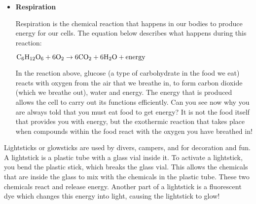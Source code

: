 \begin{enumerate}
{\begin{itemize}
\begin{center}
$\rm{Fuel + Oxygen \rightarrow Heat + Water + Carbon Dioxide}$ 

$\rm{CH_{4} + 2O_{2} \rightarrow Heat + 2H_{2}O + CO_{2}}$
\end{center}

This is why we burn fuels for energy, because the chemical changes that take place during the reaction release huge amounts of energy, which we then use for things like power and electricity. You should also note that \textit{carbon dioxide} is produced during this reaction. Later we will discuss some of the negative impacts of $CO_{2}$ on the environment. The chemical reaction that takes place when fuels burn therefore has both positive and negative consequences.\\

  \item{\textbf{Respiration}} 

Respiration is the chemical reaction that happens in our bodies to produce energy for our cells. The equation below describes what happens during this reaction:

\begin{center}
$\rm{C_{6}H_{12}O_{6} + 6O_{2} \rightarrow 6CO_{2} + 6H_{2}O + energy}$
\end{center}

In the reaction above, glucose (a type of carbohydrate in the food we eat) reacts with oxygen from the air that we breathe in, to form carbon dioxide (which we breathe out), water and energy. The energy that is produced allows the cell to carry out its functions efficiently. Can you see now why you are always told that you must eat food to get energy? It is not the food itself that provides you with energy, but the exothermic reaction that takes place when compounds within the food react with the oxygen you have breathed in! 
\end{itemize}
}
\end{enumerate}

\begin{IFact}{
Lightsticks or glowsticks are used by divers, campers, and for decoration and fun. A lightstick is a plastic tube with a glass vial inside it. To activate a lightstick, you bend the plastic stick, which breaks the glass vial. This allows the chemicals that are inside the glass to mix with the chemicals in the plastic tube. These two chemicals react and release energy. Another part of a lightstick is a fluorescent dye which changes this energy into light, causing the lightstick to glow! 
}
\end{IFact}

